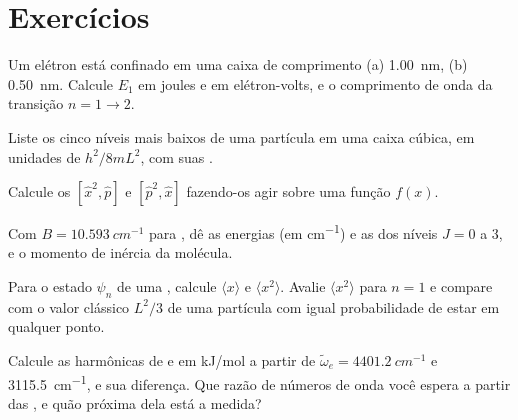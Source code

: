 \section{Exercícios}

\begin{exercise}[$\star$]\label{exo:b3:quantum-model-systems:1}
Um elétron está confinado em uma caixa de comprimento (a) \qty{1.00}{nm}, (b)
\qty{0.50}{nm}. Calcule $E_1$ em joules e em elétron-volts, e o comprimento de
onda da transição $n = 1 \to 2$.
\end{exercise}

\begin{exercise}[$\star$]\label{exo:b3:quantum-model-systems:2}
Liste os cinco níveis mais baixos de uma partícula em uma caixa cúbica, em
unidades de $h^2/8mL^2$, com suas .
\end{exercise}

\begin{exercise}[$\star$]\label{exo:b3:quantum-model-systems:3}
Calcule os  $[\hat x^2,\hat p]$ e $[\hat p^2,\hat x]$ fazendo-os
agir sobre uma função $f(x)$.
\end{exercise}

\begin{exercise}[$\star$]\label{exo:b3:quantum-model-systems:4}
Com $B = \qty{10.593}{cm^{-1}}$ para , dê as energias (em
\unit{cm^{-1}}) e as  dos níveis $J = 0$ a 3, e o momento de
inércia da molécula.
\end{exercise}

\begin{exercise}[$\star\star$]\label{exo:b3:quantum-model-systems:5}
Para o estado $\psi_n$ de uma , calcule $\langle x\rangle$ e
$\langle x^2\rangle$. Avalie $\langle x^2\rangle$ para $n = 1$ e compare com
o valor clássico $L^2/3$ de uma partícula com igual probabilidade de estar em qualquer ponto.
\end{exercise}

\begin{exercise}[$\star\star$]\label{exo:b3:quantum-model-systems:6}
Calcule as  harmônicas de  e  em
\unit{kJ/mol} a partir de $\tilde\omega_e = \qty{4401.2}{cm^{-1}}$ e
\qty{3115.5}{cm^{-1}}, e sua diferença. Que razão de números de onda você
espera a partir das , e quão próxima dela está a medida?
\end{exercise}

